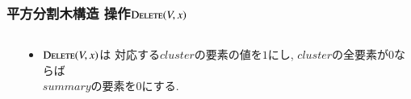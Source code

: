 \documentclass[main]{subfiles}
\begin{document}
\begin{frame}\frametitle{平方分割木構造 操作$\mathrm{\text{D\textsc{elete}}}(V,x)$}
\begin{columns}[t]
\begin{column}{0.45\linewidth}  \end{column}
\begin{column}{0.54\linewidth} 
\begin{itemize}
\item $\mathrm{\text{D\textsc{elete}}}(V,x)$は 対応する$cluster$の要素の値を$1$にし, $cluster$の全要素が$0$ならば\\ $summary$の要素を$0$にする.
\end{itemize}
 \end{column}
\end{columns}

\end{frame}
\end{document}

